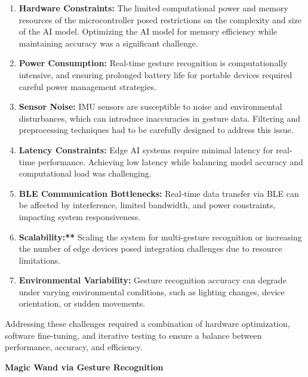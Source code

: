 \documentclass[
  9pt,
  letterpaper,
  abstract,
  titlepage]{scrbook}
\makeatletter
\renewcommand\chapter{\clearpage\global\@topnum\z@
\@afterindentfalse \secdef\@chapter\@schapter}
\newif\if@firstnumbered%
\newif\if@firstunnumbered%
\newcounter{lastRomanPage}
\let\old@chapter\chapter%
\renewcommand{\chapter}{%
  \@ifstar{\unnumbered@chapter}{\numbered@chapter}%
}
\newcommand{\numbered@chapter}[1]{%
  \if@firstnumbered%
    \cleardoublepage%
    \setcounter{lastRomanPage}{\value{page}}%
    \pagenumbering{arabic}%
    \@firstnumberedfalse%
  \else
    \setcounter{page}{\value{page}}%
  \fi
  \old@chapter{#1}%
}
\newcommand{\unnumbered@chapter}[1]{%
  \if@firstunnumbered%
    \clearpage
    \setcounter{lastRomanPage}{\value{page}}%
    \pagenumbering{roman}%
    \@firstunnumberedfalse%
  \fi
  \old@chapter*{#1}%
}
\makeatother
\begin{document}
\begin{enumerate}
\def\labelenumi{\arabic{enumi}.}
\item
  \textbf{Hardware Constraints:} The limited computational power and
  memory resources of the microcontroller posed restrictions on the
  complexity and size of the AI model. Optimizing the AI model for
  memory efficiency while maintaining accuracy was a significant
  challenge.
\item
  \textbf{Power Consumption:} Real-time gesture recognition is
  computationally intensive, and ensuring prolonged battery life for
  portable devices required careful power management strategies.
\item
  \textbf{Sensor Noise:} IMU sensors are susceptible to noise and
  environmental disturbances, which can introduce inaccuracies in
  gesture data. Filtering and preprocessing techniques had to be
  carefully designed to address this issue.
\item
  \textbf{Latency Constraints:} Edge AI systems require minimal latency
  for real-time performance. Achieving low latency while balancing model
  accuracy and computational load was challenging.
\item
  \textbf{BLE Communication Bottlenecks:} Real-time data transfer via
  BLE can be affected by interference, limited bandwidth, and power
  constraints, impacting system responsiveness.
\item
  \textbf{Scalability:**} Scaling the system for multi-gesture
  recognition or increasing the number of edge devices posed integration
  challenges due to resource limitations.
\item
  \textbf{Environmental Variability:} Gesture recognition accuracy can
  degrade under varying environmental conditions, such as lighting
  changes, device orientation, or sudden movements.
\end{enumerate}

Addressing these challenges required a combination of hardware
optimization, software fine-tuning, and iterative testing to ensure a
balance between performance, accuracy, and efficiency.

\chapter{\texorpdfstring{\textbf{Magic Wand via Gesture
Recognition}}{Magic Wand via Gesture Recognition}}\label{magic-wand-via-gesture-recognition}
\end{document}
